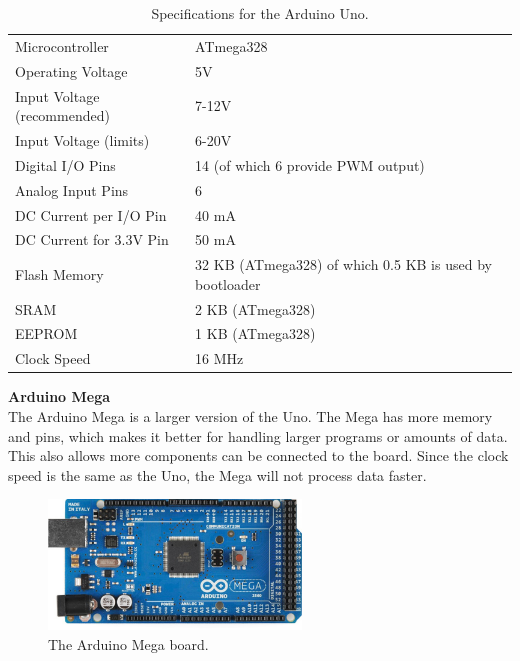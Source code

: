 \begin{table}
\begin{tabular}{| l | l |}
\hline
Microcontroller & ATmega328\\
Operating Voltage & 5V\\
Input Voltage (recommended) & 7-12V\\
Input Voltage (limits) & 6-20V\\
Digital I/O Pins & 14 (of which 6 provide PWM output)\\
Analog Input Pins & 6\\
DC Current per I/O Pin & 40 mA\\
DC Current for 3.3V Pin & 50 mA\\
Flash Memory & 32 KB (ATmega328) of which 0.5 KB is used by bootloader\\
SRAM & 2 KB (ATmega328)\\
EEPROM & 1 KB (ATmega328)\\
Clock Speed & 16 MHz\\
\hline
\end{tabular}
\caption{Specifications for the Arduino Uno\cite{arduinouno}.}
\end{table}
\label{tab:unospec}

\textbf{Arduino Mega}\\
The Arduino Mega is a larger version of the Uno. The Mega has more memory and pins, which makes it better for handling larger programs or amounts of data. This also allows more components can be connected to the board. Since the clock speed is the same as the Uno, the Mega will not process data faster.

\begin{figure}[h!]
\centering
\includegraphics[width=0.6\textwidth]{chapters/analysis/figs/ArduinoMega.jpg}
\caption{The Arduino Mega board\cite{arduinomegaimg}.}
\label{fig:arduinomega}
\end{figure}


